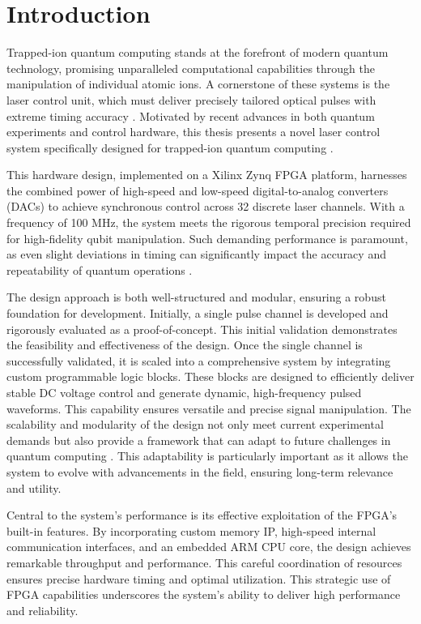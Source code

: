 \chapter{Introduction}

Trapped-ion quantum computing stands at the forefront of modern quantum technology, promising unparalleled computational capabilities through the manipulation of individual atomic ions. A cornerstone of these systems is the laser control unit, which must deliver precisely tailored optical pulses with extreme timing accuracy \cite{manychanfpgactrlsys}. Motivated by recent advances in both quantum experiments and control hardware, this thesis presents a novel laser control system specifically designed for trapped-ion quantum computing \cite{sys_repo}.

This hardware design, implemented on a Xilinx Zynq FPGA platform, harnesses the combined power of high-speed and low-speed digital-to-analog converters (DACs) to achieve synchronous control across 32 discrete laser channels. With a frequency of 100 MHz, the system meets the rigorous temporal precision required for high-fidelity qubit manipulation. Such demanding performance is paramount, as even slight deviations in timing can significantly impact the accuracy and repeatability of quantum operations \cite{manychanfpgactrlsys}.

The design approach is both well-structured and modular, ensuring a robust foundation for development. Initially, a single pulse channel is developed and rigorously evaluated as a proof-of-concept. This initial validation demonstrates the feasibility and effectiveness of the design. Once the single channel is successfully validated, it is scaled into a comprehensive system by integrating custom programmable logic blocks. These blocks are designed to efficiently deliver stable DC voltage control and generate dynamic, high-frequency pulsed waveforms. This capability ensures versatile and precise signal manipulation. The scalability and modularity of the design not only meet current experimental demands but also provide a framework that can adapt to future challenges in quantum computing \cite{programmablesoc4ctrlexperiment}. This adaptability is particularly important as it allows the system to evolve with advancements in the field, ensuring long-term relevance and utility.

Central to the system's performance is its effective exploitation of the FPGA's built-in features. By incorporating custom memory IP, high-speed internal communication interfaces, and an embedded ARM CPU core, the design achieves remarkable throughput and performance. This careful coordination of resources ensures precise hardware timing and optimal utilization. This strategic use of FPGA capabilities underscores the system's ability to deliver high performance and reliability.